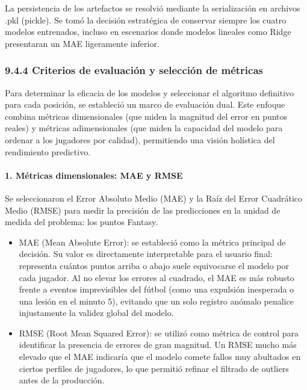 La persistencia de los artefactos se resolvió mediante la serialización en archivos .pkl (pickle). Se tomó la decisión estratégica de conservar
siempre los cuatro modelos entrenados, incluso en escenarios donde modelos lineales como Ridge presentaran
un MAE ligeramente inferior.
 
\subsubsection{9.4.4 Criterios de evaluación y selección de métricas}
 
Para determinar la eficacia de los modelos y seleccionar el algoritmo definitivo para cada posición, se estableció un marco de evaluación dual.
Este enfoque combina métricas dimensionales (que miden la magnitud del error en puntos reales) y métricas adimensionales (que miden la capacidad
del modelo para ordenar a los jugadores por calidad), permitiendo una visión holística del rendimiento predictivo.
 
\paragraph{1. Métricas dimensionales: MAE y RMSE}
 
Se seleccionaron el Error Absoluto Medio (MAE) y la Raíz del Error Cuadrático Medio (RMSE) para medir la precisión de las predicciones en la unidad de medida del problema: los puntos Fantasy.
 
\begin{itemize}
\item MAE (Mean Absolute Error): se estableció como la métrica principal de decisión. Su valor es directamente interpretable para el usuario final:
representa cuántos puntos arriba o abajo suele equivocarse el modelo por cada jugador. Al no elevar los errores al cuadrado, el MAE es más robusto
frente a eventos imprevisibles del fútbol (como una expulsión inesperada o una lesión en el minuto 5), evitando que un solo registro anómalo penalice
injustamente la validez global del modelo.
 
\item RMSE (Root Mean Squared Error): se utilizó como métrica de control para identificar la presencia de errores de gran magnitud. Un RMSE mucho más
elevado que el MAE indicaría que el modelo comete fallos muy abultados en ciertos perfiles de jugadores, lo que permitió refinar el filtrado de outliers antes de la producción.
\end{itemize}
 
